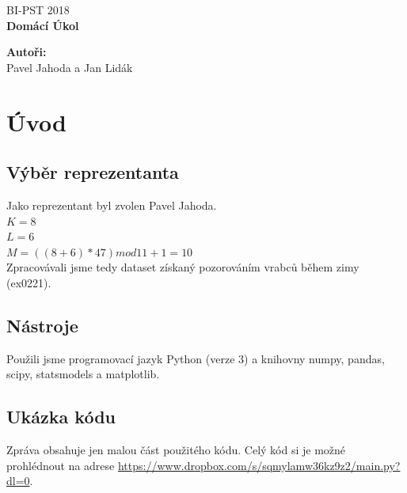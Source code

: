\documentclass[12pt,a4paper]{article}
\begin{document}
\begin{titlepage}
  \thispagestyle{fancy}

  \vspace*{\fill}
  \begin{center}
    {\fontsize{20}{30}\selectfont BI-PST 2018}\\[1cm]
    {\fontsize{30}{100}\selectfont \textbf{Domácí Úkol}}\\[4.2cm]
  \end{center}

  \vspace*{\fill}

  {\fontsize{10}{10} \selectfont \noindent
  \textbf{Autoři:}\\
  Pavel Jahoda a Jan Lidák
  }
\end{titlepage}

\renewcommand{\headrulewidth}{0.4pt}
\renewcommand{\footrulewidth}{0.4pt}


\tableofcontents

\newpage


\section{Úvod}
\subsection{Výběr reprezentanta}
Jako reprezentant byl zvolen Pavel Jahoda.\\
$K = 8$\\
$L = 6$\\
$M = ((8+6)*47) mod 11 + 1 = 10$\\
Zpracovávali jsme tedy dataset získaný pozorováním vrabců během zimy (ex0221).
\subsection{Nástroje}
Použili jsme programovací jazyk Python (verze 3) a knihovny numpy, pandas, scipy, statsmodels a matplotlib.
\subsection{Ukázka kódu}
Zpráva obsahuje jen malou část použitého kódu. Celý kód si je možné prohlédnout na adrese \url{https://www.dropbox.com/s/sqmylamw36kz9z2/main.py?dl=0}.
\pagebreak
\end{document}
